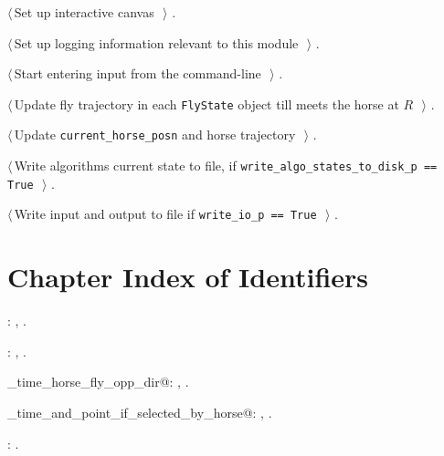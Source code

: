 \documentclass[11.5pt]{report}
\begin{document}
{\begin{list}{}{\setlength{\itemsep}{-\parsep}\setlength{\itemindent}{-\leftmargin}}
\item $\langle\,$Set up interactive canvas\nobreak\ {\footnotesize {}}$\,\rangle$ {\footnotesize {\NWtxtRefIn} .}
\item $\langle\,$Set up logging information relevant to this module\nobreak\ {\footnotesize {}}$\,\rangle$ {\footnotesize {\NWtxtRefIn} .}
\item $\langle\,$Start entering input from the command-line\nobreak\ {\footnotesize {}}$\,\rangle$ {\footnotesize {\NWtxtRefIn} .}
\item $\langle\,$Update fly trajectory in each \verb|FlyState| object till  meets the horse at $R$\nobreak\ {\footnotesize {}}$\,\rangle$ {\footnotesize {\NWtxtRefIn} .}
\item $\langle\,$Update \verb|current_horse_posn| and horse trajectory\nobreak\ {\footnotesize {}}$\,\rangle$ {\footnotesize {\NWtxtRefIn} .}
\item $\langle\,$Write algorithms current state to file, if \verb|write_algo_states_to_disk_p == True|\nobreak\ {\footnotesize {}}$\,\rangle$ {\footnotesize {\NWtxtRefIn} .}
\item $\langle\,$Write input and output to file if \verb|write_io_p == True|\nobreak\ {\footnotesize {}}$\,\rangle$ {\footnotesize {\NWtxtRefIn} .}
\end{list}}
\section{Chapter Index of Identifiers}

{\small\begin{list}{}{\setlength{\itemsep}{-\parsep}\setlength{\itemindent}{-\leftmargin}}
\item \verb@clearAllStates@: , \underline{}.
\item \verb@getTour@: , \underline{}.
\item \verb@meeting_time_horse_fly_opp_dir@: , \underline{}.
\item \verb@rendezvous_time_and_point_if_selected_by_horse@: , \underline{}.
\item \verb@wrapperkeyPressHandler@: \underline{}.
\end{list}} 
\end{document}
